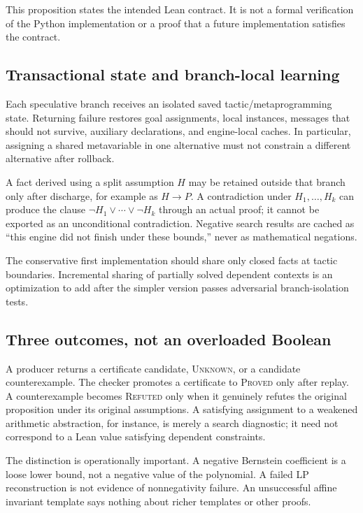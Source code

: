 \documentclass[11pt,a4paper]{article}
\newcommand{\unknown}{\textsc{Unknown}}
\newcommand{\proved}{\textsc{Proved}}
\newcommand{\refuted}{\textsc{Refuted}}
\begin{document}
This proposition states the intended Lean contract. It is not a formal verification of the Python implementation or a proof that a future implementation satisfies the contract.

\subsection{Transactional state and branch-local learning}
Each speculative branch receives an isolated saved tactic/metaprogramming state. Returning failure restores goal assignments, local instances, messages that should not survive, auxiliary declarations, and engine-local caches. In particular, assigning a shared metavariable in one alternative must not constrain a different alternative after rollback.

A fact derived using a split assumption $H$ may be retained outside that branch only after discharge, for example as $H\to P$. A contradiction under $H_1,\ldots,H_k$ can produce the clause $\neg H_1\lor\cdots\lor\neg H_k$ through an actual proof; it cannot be exported as an unconditional contradiction. Negative search results are cached as ``this engine did not finish under these bounds,'' never as mathematical negations.

The conservative first implementation should share only closed facts at tactic boundaries. Incremental sharing of partially solved dependent contexts is an optimization to add after the simpler version passes adversarial branch-isolation tests.

\subsection{Three outcomes, not an overloaded Boolean}
A producer returns a certificate candidate, \unknown{}, or a candidate counterexample. The checker promotes a certificate to \proved{} only after replay. A counterexample becomes \refuted{} only when it genuinely refutes the original proposition under its original assumptions. A satisfying assignment to a weakened arithmetic abstraction, for instance, is merely a search diagnostic; it need not correspond to a Lean value satisfying dependent constraints.

The distinction is operationally important. A negative Bernstein coefficient is a loose lower bound, not a negative value of the polynomial. A failed LP reconstruction is not evidence of nonnegativity failure. An unsuccessful affine invariant template says nothing about richer templates or other proofs.
\end{document}
